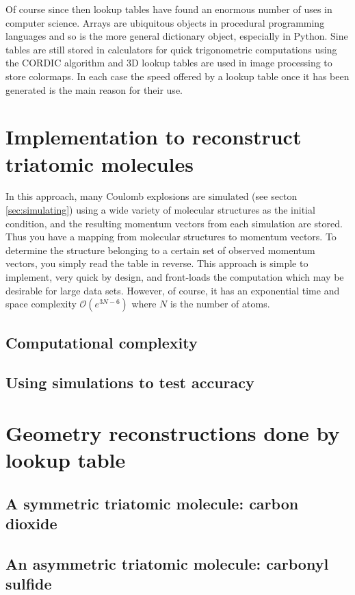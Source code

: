 Of course since then lookup tables have found an enormous number of uses in computer science. Arrays are ubiquitous objects in procedural programming languages and so is the more general dictionary object, especially in Python. Sine tables are still stored in calculators for quick trigonometric computations using the CORDIC algorithm and 3D lookup tables are used in image processing to store colormaps. In each case the speed offered by a lookup table once it has been generated is the main reason for their use.

\section{Implementation to reconstruct triatomic molecules}
In this approach, many Coulomb explosions are simulated (see secton \ref{sec:simulating}) using a wide variety of molecular structures as the initial condition, and the resulting momentum vectors from each simulation are stored. Thus you have a mapping from molecular structures to momentum vectors. To determine the structure belonging to a certain set of observed momentum vectors, you simply read the table in reverse. This approach is simple to implement, very quick by design, and front-loads the computation which may be desirable for large data sets. However, of course, it has an exponential time and space complexity $\mathcal{O}(e^{3N-6})$ where $N$ is the number of atoms.

\subsection{Computational complexity}

\subsection{Using simulations to test accuracy}

\section{Geometry reconstructions done by lookup table}
\subsection{A symmetric triatomic molecule: carbon dioxide}
\subsection{An asymmetric triatomic molecule: carbonyl sulfide}

